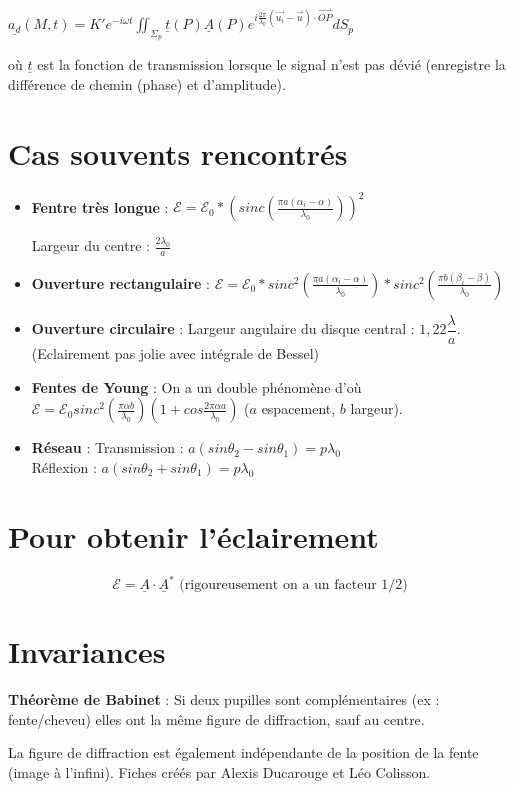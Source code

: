 \documentclass[9pt]{article}
\begin{document}
\begin{multicols*}{2}
$\boxed{\underline{a_d}(M,t) = K' e^{-i\omega t} \iint_{\Sigma_p} \underline{t} (P) \underline{A}(P) e^{i \frac{2\pi}{\lambda_0} (\overrightarrow{u_i} - \overrightarrow{u}) \cdot \overrightarrow{OP}  } dS_p }$

où $\underline{t} $ est la fonction de transmission lorsque le signal n'est pas dévié (enregistre la différence de chemin (phase) et d'amplitude).

\section{Cas souvents rencontrés}
\begin{itemize}
\item \textbf{Fentre très longue} : $\mathcal{E} = \mathcal{E}_0 * \left( sinc \left( \frac{\pi a (\alpha_i - \alpha)}{\lambda_0} \right) \right)^2 $
  
  Largeur du centre : $\frac{2\lambda_0}{a} $
  
\item \textbf{Ouverture rectangulaire} : $\mathcal{E} = \mathcal{E}_0 * sinc^2 \left( \frac{\pi a (\alpha_i - \alpha)}{\lambda_0} \right) * sinc^2 \left( \frac{\pi b (\beta_i - \beta)}{\lambda_0} \right) $
\item \textbf{Ouverture circulaire} : Largeur angulaire du disque central : $1,22 \dfrac{\lambda}{a} $. (Eclairement pas jolie avec intégrale de Bessel)
\item \textbf{Fentes de Young} : On a un double phénomène d'où $\mathcal{E} = \mathcal{E}_0 sinc^2 \left( \frac{\pi \alpha b}{\lambda_0}  \right) \left( 1 + cos \frac{2\pi\alpha a}{\lambda_0}  \right) $ ($a$ espacement, $b$ largeur).
\item \textbf{Réseau} : Transmission : $\boxed{a(sin \theta_2 - sin \theta_1) = p\lambda_0}$\\
Réflexion : $\boxed{a(sin \theta_2 + sin \theta_1) = p\lambda_0}$
\end{itemize}

\section{Pour obtenir l'éclairement}
$$\boxed{\mathcal{E} = \underline{A} \cdot \underline{A} ^*} \text{ (rigoureusement on a un facteur 1/2)}$$

\section{Invariances}
\textbf{Théorème de Babinet} : Si deux pupilles sont complémentaires (ex : fente/cheveu) elles ont la même figure de diffraction, sauf au centre.

La figure de diffraction est également indépendante de la position de la fente (image à l'infini).
\vfill\null
\footnotesize{Fiches créés par Alexis Ducarouge et Léo Colisson.}
\end{multicols*}
\end{document}
